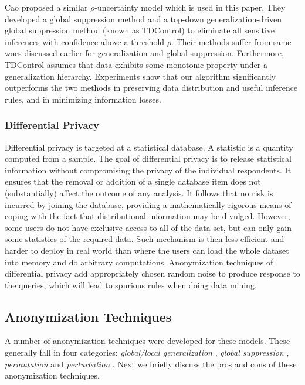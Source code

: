 Cao \etal \cite{Cao:2010:rho} proposed a similar $\rho$-uncertainty model
which is used in this paper. They developed a global suppression method and a top-down generalization-driven global suppression method (known as TDControl) to eliminate all sensitive inferences with confidence above
a threshold $\rho$.
Their methods suffer from same woes discussed earlier for generalization and
global suppression. Furthermore, TDControl assumes that data exhibits some monotonic property under a generalization hierarchy. 
Experiments show that our algorithm significantly outperforms the two methods in preserving data distribution and useful inference rules, and in minimizing information losses.

\subsubsection{Differential Privacy}

Differential privacy \cite{Dwork08:diff:survey}
is targeted at a statistical database. A statistic is a quantity computed from a sample. The goal of differential privacy is to release statistical information without compromising the privacy of the individual respondents.
It ensures that the removal or addition of a single database item does not
(substantially) affect the outcome of any analysis.
It follows that no risk is incurred by joining the database,
providing a mathematically rigorous means of coping with
the fact that distributional information may be divulged.
However, 
some users do not have exclusive access to all of the data set, but can only gain some statistics of the required data.
Such mechanism is then less efficient and harder to
deploy in real world than where the users can load the
whole dataset into memory and do arbitrary computations.
Anonymization techniques of differential privacy add appropriately chosen random noise to produce response to the queries, which will lead to spurious rules when doing data mining.

\subsection{Anonymization Techniques}

A number of anonymization techniques were developed for these models.
These generally fall in four categories\cite{Machanavajjhala12}: {\em
global/local generalization}
\cite{samarati1998,Iyengar:2002:TDS,LeFevre:2006:Mondrian,Terrovitis:2008:PAS,He:2009:ASD,Cao:2010:rho}, {\em global suppression} \cite{atallah99:disclosure,Xu:2008:ATD,Cao:2010:rho},
{\em permutation} \cite{2011:TKDE:Anonymous} and {\em perturbation}
\cite{Zhang:2007:agg,ChenMFDX11:Diff,Javier2012,WangW05}. Next we briefly discuss the pros and
cons of these anonymization techniques.

